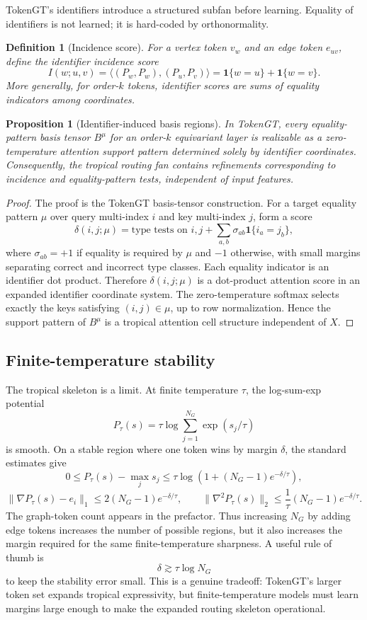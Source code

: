 \documentclass[11pt]{article}
\newtheorem{proposition}[theorem]{Proposition}
\newtheorem{definition}[theorem]{Definition}
\newcommand{\one}{\mathbf{1}}
\begin{document}
TokenGT's identifiers introduce a structured subfan before learning.  Equality of identifiers is not learned; it is hard-coded by orthonormality.

\begin{definition}[Incidence score]
For a vertex token $v_w$ and an edge token $e_{uv}$, define the identifier incidence score
\[
  I(w;u,v)=\langle (P_w,P_w),(P_u,P_v)\rangle
  =
  \one\{w=u\}+\one\{w=v\}.
\]
More generally, for order-$k$ tokens, identifier scores are sums of equality indicators among coordinates.
\end{definition}

\begin{proposition}[Identifier-induced basis regions]
\label{prop:incidence-fan}
In TokenGT, every equality-pattern basis tensor $B^\mu$ for an order-$k$ equivariant layer is realizable as a zero-temperature attention support pattern determined solely by identifier coordinates.  Consequently, the tropical routing fan contains refinements corresponding to incidence and equality-pattern tests, independent of input features.
\end{proposition}

\begin{proof}
The proof is the TokenGT basis-tensor construction.  For a target equality pattern $\mu$ over query multi-index $i$ and key multi-index $j$, form a score
\[
  \delta(i,j;\mu)=
  \text{type tests on } i,j
  +
  \sum_{a,b} \sigma_{ab}\one\{i_a=j_b\},
\]
where $\sigma_{ab}=+1$ if equality is required by $\mu$ and $-1$ otherwise, with small margins separating correct and incorrect type classes.  Each equality indicator is an identifier dot product.  Therefore $\delta(i,j;\mu)$ is a dot-product attention score in an expanded identifier coordinate system.  The zero-temperature softmax selects exactly the keys satisfying $(i,j)\in\mu$, up to row normalization.  Hence the support pattern of $B^\mu$ is a tropical attention cell structure independent of $X$.
\end{proof}

\subsection{Finite-temperature stability}

The tropical skeleton is a limit.  At finite temperature $\tau$, the log-sum-exp potential
\[
  P_\tau(s)=\tau\log\sum_{j=1}^{N_G}\exp(s_j/\tau)
\]
is smooth.  On a stable region where one token wins by margin $\delta$, the standard estimates give
\[
  0\le P_\tau(s)-\max_j s_j\le \tau\log(1+(N_G-1)e^{-\delta/\tau}),
\]
\[
  \|\nabla P_\tau(s)-e_i\|_1\le 2(N_G-1)e^{-\delta/\tau},
  \qquad
  \|\nabla^2P_\tau(s)\|_2\le \frac{1}{\tau}(N_G-1)e^{-\delta/\tau}.
\]
The graph-token count appears in the prefactor.  Thus increasing $N_G$ by adding edge tokens increases the number of possible regions, but it also increases the margin required for the same finite-temperature sharpness.  A useful rule of thumb is
\[
  \delta \gtrsim \tau\log N_G
\]
to keep the stability error small.  This is a genuine tradeoff: TokenGT's larger token set expands tropical expressivity, but finite-temperature models must learn margins large enough to make the expanded routing skeleton operational.
\end{document}
